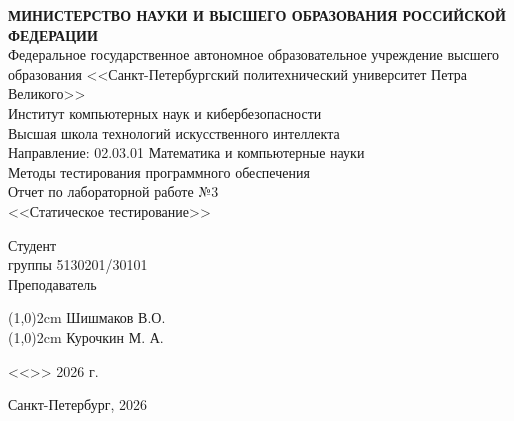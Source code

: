 \documentclass{article}[14pt]
\begin{document}
	
\thispagestyle{empty}
\begin{center}
	\Large {\bfseries МИНИСТЕРСТВО НАУКИ И ВЫСШЕГО ОБРАЗОВАНИЯ РОССИЙСКОЙ ФЕДЕРАЦИИ}
	\\
	\vspace{3mm}
	Федеральное государственное автономное образовательное учреждение высшего образования <<Санкт-Петербургский политехнический университет Петра Великого>>
	\\
	\vspace{3mm}
	Институт компьютерных наук и кибербезопасности
	\\
	\vspace{3mm}
	Высшая школа технологий искусственного интеллекта
	\\
	\vspace{3mm}
	Направление: 02.03.01 Математика и компьютерные науки
	\\
	\vspace{2cm}
	\large{
		Методы тестирования программного обеспечения}
	\\
	\LARGE{
		Отчет по лабораторной работе №3\\
		<<Статическое тестирование>>}
\end{center}

\vspace{5.5cm}
\begin{flushleft}
	\Large
	Студент
	\\
	группы 5130201/30101
	\\
	\vspace{2cm}
	\Large
	Преподаватель
	\\ 
\end{flushleft}
\vspace{-4.6cm}
\begin{flushright}
	\Large
	\line(1,0){2cm}
	\hspace{0.4cm}
	Шишмаков В.О.
	\\
	\vspace{2,7cm}
	\hspace{2cm}
	\Large
	\line(1,0){2cm}
	\hspace{0.4cm}
	Курочкин М. А.
	\hspace{-0.1cm}
	
\end{flushright}

\vspace{1cm}
\hspace{9.8cm}
{
	\Large
	\vspace{0.8cm}
	<<\underline{\hspace{1cm}}>>\underline{\hspace{2.5cm}} 2026 г.
}
\hfill \break
\hfill \break
\hfill \break
\hfill \break
\begin{center} \large{Санкт-Петербург, 2026} \end{center}
\pagebreak
\end{document}
